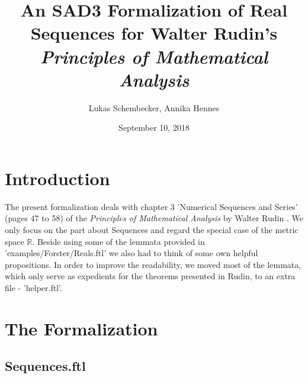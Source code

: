 \documentclass{article}
\begin{document}
\title{An SAD3 Formalization of Real Sequences for Walter Rudin's
\it{Principles of Mathematical Analysis}}

\author{Lukas Schembecker, Annika Hennes}

\date{September 10, 2018}

\maketitle


\section{Introduction}
The present formalization deals with chapter 3 'Numerical Sequences and Series' (pages 47 to 58) of the {\it Principles of Mathematical Analysis} by Walter Rudin \cite{Rudin}. We only focus on the part about Sequences and regard the special case of the metric space $\mathbb{R}$. Beside using some of the lemmata provided in 'examples/Forster/Reals.ftl' we also had to think of some own helpful propositions. In order to improve the readability, we moved most of the lemmata, which only serve as expedients for the theorems presented in Rudin, to an extra file - 'helper.ftl'.

\section{The Formalization}
\subsection{Sequences.ftl}
\end{document}
